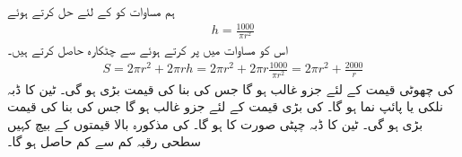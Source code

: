 ہم مساوات  کو  کے لئے حل کرتے ہوئے
\begin{align*}
h=\frac{1000}{\pi r^2}
\end{align*}
اس کو مساوات  میں پر کرتے ہوئے  سے چٹکارہ  حاصل کرتے ہیں۔
\begin{align*}
S=2\pi r^2+2\pi rh=2\pi r^2+2\pi r\frac{1000}{\pi r^2}=2\pi r^2+\frac{2000}{r}
\end{align*}
 کی چھوٹی قیمت کے لئے  جزو غالب ہو گا جس کی بنا  کی قیمت بڑی ہو گی۔ ٹین کا ڈبہ نلکی یا پائپ نما ہو گا۔  کی بڑی قیمت کے لئے  جزو غالب ہو گا جس کی بنا  کی قیمت بڑی ہو گی۔ ٹین کا ڈبہ چپٹی صورت کا ہو گا۔  کی مذکورہ بالا قیمتوں کے بیچ کہیں سطحی رقبہ کم سے کم حاصل ہو گا۔

